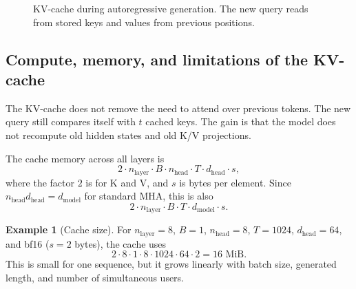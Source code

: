 \documentclass[11pt,a4paper]{article}
\theoremstyle{definition}
\newtheorem{example}{Example}[section]
\theoremstyle{plain}
\newcommand{\vq}{\bm{q}}
\newcommand{\vk}{\bm{k}}
\newcommand{\vv}{\bm{v}}
\newcommand{\mK}{\bm{K}}
\newcommand{\mV}{\bm{V}}
\newcommand{\dmodel}{d_{\mathrm{model}}}
\newcommand{\dhead}{d_{\mathrm{head}}}
\newcommand{\nhead}{n_{\mathrm{head}}}
\newcommand{\nlayer}{n_{\mathrm{layer}}}
\begin{document}
\begin{figure}[H]
\centering
{}
\caption{KV-cache during autoregressive generation. The new query reads from stored keys and values from previous positions.}
\label{fig:kv-cache}
\end{figure}

\subsection{Compute, memory, and limitations of the KV-cache}

The KV-cache does not remove the need to attend over previous tokens. The new query still compares itself with $t$ cached keys. The gain is that the model does not recompute old hidden states and old K/V projections.

The cache memory across all layers is
\begin{equation}\label{eq:kvcache_memory}
    2\cdot\nlayer\cdot B\cdot\nhead\cdot T\cdot\dhead\cdot s,
\end{equation}
where the factor $2$ is for K and V, and $s$ is bytes per element. Since $\nhead\dhead=\dmodel$ for standard MHA, this is also
\begin{equation}
    2\cdot\nlayer\cdot B\cdot T\cdot\dmodel\cdot s.
\end{equation}

\begin{example}[Cache size]
For $\nlayer=8$, $B=1$, $\nhead=8$, $T=1024$, $\dhead=64$, and bf16 ($s=2$ bytes), the cache uses
\begin{equation}
    2\cdot8\cdot1\cdot8\cdot1024\cdot64\cdot2=16\text{ MiB}.
\end{equation}
This is small for one sequence, but it grows linearly with batch size, generated length, and number of simultaneous users.
\end{example}
\end{document}
